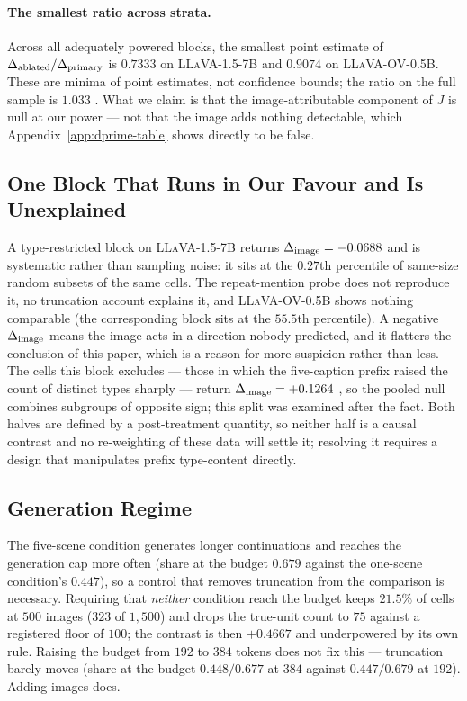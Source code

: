 \paragraph{The smallest ratio across strata.} Across all adequately powered blocks, the smallest point
estimate of $\Delta_{\mathrm{ablated}} / \Delta_{\mathrm{primary}}$ is $0.7333$ on \textsc{LLaVA-1.5-7B} and $0.9074$ on \textsc{LLaVA-OV-0.5B}. These
are minima of point estimates, not confidence bounds; the ratio on the full sample is $1.033$
. What we claim is that the image-attributable component of $J$ is null at our
power --- not that the image adds nothing detectable,
which Appendix~\ref{app:dprime-table} shows directly to be false.

\subsection{One Block That Runs in Our Favour and Is Unexplained}
\label{app:oddblock}

A type-restricted block on \textsc{LLaVA-1.5-7B} returns $\Delta_{\mathrm{image}} = -0.0688$
 and is systematic rather than sampling noise: it sits at the $0.27$th
percentile of same-size random subsets of the same cells. The repeat-mention probe does not reproduce
it, no truncation account explains it, and \textsc{LLaVA-OV-0.5B} shows nothing comparable (the
corresponding block sits at the $55.5$th percentile). A negative $\Delta_{\mathrm{image}}$ means the image acts in a
direction nobody predicted, and it flatters the conclusion of this paper, which is a reason for more
suspicion rather than less. The cells this block excludes --- those in which the five-caption prefix raised the count of distinct
types sharply --- return $\Delta_{\mathrm{image}} = +0.1264$ , so the pooled null combines
subgroups of opposite sign; this split was examined after the fact. Both halves are defined by a
post-treatment quantity, so neither half is a causal contrast and no re-weighting of these data will settle it; resolving it
requires a design that manipulates prefix type-content directly.

\subsection{Generation Regime}
\label{app:regime}

The five-scene condition generates longer continuations and reaches the generation cap more often
(share at the budget $0.679$ against the one-scene condition's $0.447$), so a control that removes
truncation from the comparison is necessary. Requiring that \emph{neither} condition reach the budget
keeps $21.5\%$ of cells at $500$ images ($323$ of $1{,}500$) and drops the true-unit count to $75$
against a registered floor of $100$; the contrast is then $+0.4667$  and
underpowered by its own rule. Raising the budget from $192$ to $384$ tokens does not fix this ---
truncation barely moves (share at the budget $0.448 / 0.677$ at $384$ against $0.447 / 0.679$ at
$192$). Adding images does.

